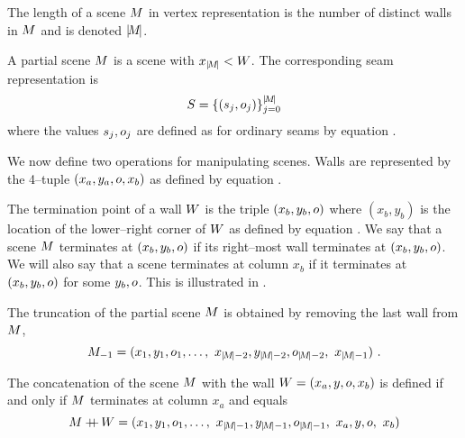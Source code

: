 \begin{definition}
  \label{def:scene-len}
  The length of a scene $\Scene$ in vertex representation
   is the number of distinct walls in $\Scene$ and
  is denoted $\Length{\Scene}$.
\end{definition}

\begin{definition}
  \label{def:partial-scene}
  A partial scene $\PartialScene$ is a scene with
  $x_{\Length{\Scene}}<\Width$. The corresponding seam representation
  is
  \begin{equation}
    \PartialSeam = \{(\seam_j,\WallOrient_j)\}_{j=0}^{\Length{\PartialScene}}
  \end{equation}
  where the values $\seam_j,\WallOrient_j$ are defined as for ordinary
  seams by equation .
\end{definition}

We now define two operations for manipulating scenes. Walls are
represented by the 4--tuple $(x_a,y_a,\WallOrient,x_b)$ as defined by
equation .

\begin{definition}
  The termination point of a wall $\Wall$ is the triple
  $(x_b,y_b,\WallOrient)$ where $(x_b,y_b)$ is the location of the
  lower--right corner of $\Wall$ as defined by equation
  . We say that a scene $\Scene$ terminates at
  $(x_b,y_b,\WallOrient)$ if its right--most wall terminates at
  $(x_b,y_b,\WallOrient)$. We will also say that a scene terminates at
  column $x_b$ if it terminates at $(x_b,y_b,\WallOrient)$ for some
  $y_b,\WallOrient$. This is illustrated in .
\end{definition}

\begin{definition}
  \label{def:truncation}
  The truncation of the partial scene $\PartialScene$ is obtained
  by removing the last wall from $\PartialScene$,
  \begin{equation}
    \PartialScene_{-1} = 
    ( x_1,y_1,\WallOrient_1,
    \ldots,
    ~x_{\SceneLen-2},y_{\SceneLen-2},\WallOrient_{\SceneLen-2},
    ~x_{\SceneLen-1} )~.
  \end{equation}
\end{definition}

\begin{definition}
  \label{def:concatenation}
  The concatenation of the scene $\PartialScene$ with the wall
  $\Wall=(x_a,y,\WallOrient,x_b)$ is defined if and only if
  $\PartialScene$ terminates at column $x_a$ and equals
  \begin{equation}
    \PartialScene \concat \Wall = 
    ( x_1,y_1,\WallOrient_1,
    \ldots,
    ~x_{\SceneLen-1},y_{\SceneLen-1},\WallOrient_{\SceneLen-1},
    ~x_a, y, \WallOrient, ~ x_b )
  \end{equation}
\end{definition}

